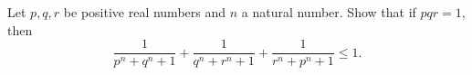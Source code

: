 Let $p, q, r$ be positive real numbers and $n$ a natural number. Show that if $pqr = 1$,  then \[ \frac{1}{p^n+q^n+1} + \frac{1}{q^n+r^n+1} + \frac{1}{r^n+p^n+1} \leq 1. \]